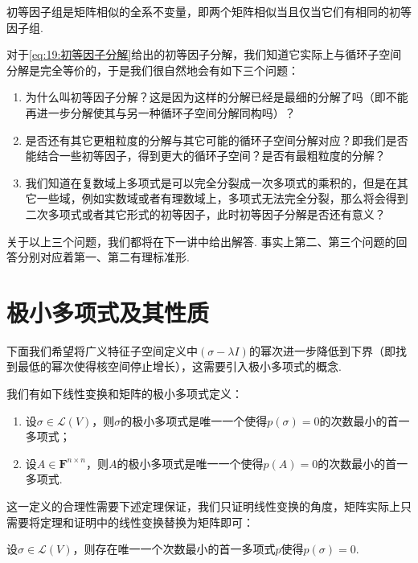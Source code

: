 \begin{theorem} \label{thm:19:初等因子组是相似全系不变量}
    初等因子组是矩阵相似的全系不变量，即两个矩阵相似当且仅当它们有相同的初等因子组.
\end{theorem}

对于\autoref{eq:19:初等因子分解}给出的初等因子分解，我们知道它实际上与循环子空间分解是完全等价的，于是我们很自然地会有如下三个问题：
\begin{enumerate}
    \item 为什么叫初等因子分解？这是因为这样的分解已经是最细的分解了吗（即不能再进一步分解使其与另一种循环子空间分解同构吗）？
    \item 是否还有其它更粗粒度的分解与其它可能的循环子空间分解对应？即我们是否能结合一些初等因子，得到更大的循环子空间？是否有最粗粒度的分解？
    \item 我们知道在复数域上多项式是可以完全分裂成一次多项式的乘积的，但是在其它一些域，例如实数域或者有理数域上，多项式无法完全分裂，那么将会得到二次多项式或者其它形式的初等因子，此时初等因子分解是否还有意义？
\end{enumerate}
关于以上三个问题，我们都将在下一讲中给出解答. 事实上第二、第三个问题的回答分别对应着第一、第二有理标准形.

\section{极小多项式及其性质}
下面我们希望将广义特征子空间定义中$(\sigma-\lambda I)$的幂次进一步降低到下界（即找到最低的幂次使得核空间停止增长），这需要引入极小多项式的概念.
\begin{definition}
    我们有如下线性变换和矩阵的极小多项式定义：
    \begin{enumerate}
        \item 设$\sigma\in \mathcal{L}(V)$，则$\sigma$的极小多项式是唯一一个使得$p(\sigma)=0$的次数最小的首一多项式；

        \item 设$A\in\mathbf{F}^{n\times n}$，则$A$的极小多项式是唯一一个使得$p(A)=0$的次数最小的首一多项式.
    \end{enumerate}
\end{definition}
这一定义的合理性需要下述定理保证，我们只证明线性变换的角度，矩阵实际上只需要将定理和证明中的线性变换替换为矩阵即可：
\begin{theorem}\label{thm:21:极小多项式存在}
    设$\sigma\in \mathcal{L}(V)$，则存在唯一一个次数最小的首一多项式$p$使得$p(\sigma)=0$.
\end{theorem}


